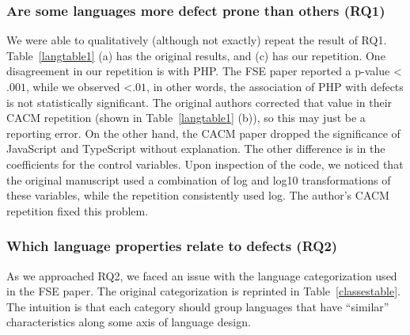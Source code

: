 \documentclass[acmsmall]{acmart}
\newcommand{\ts}{{\sf  TypeScript}\xspace}
\newcommand{\js}{{\sf  JavaScript}\xspace}
\newcommand{\php}{{\sf  PHP}\xspace}
\begin{document}
\subsubsection{Are some languages more defect prone than others (RQ1)}

We were able to qualitatively (although not exactly) repeat the result of
RQ1. Table~\ref{langtable1} (a) has the original results, and (c) has our
repetition. One disagreement in our repetition is with \php. The FSE paper
reported a p-value <$.001$, while we observed <$.01$, in other words, the
association of \php with defects is not statistically significant. The
original authors corrected that value in their CACM repetition (shown in
Table~\ref{langtable1} (b)), so this may just be a reporting error. On the
other hand, the CACM paper dropped the significance of \js and \ts without
explanation. The other difference is in the coefficients for the control
variables. Upon inspection of the code, we noticed that the original
manuscript used a combination of log and log10 transformations of these
variables, while the repetition consistently used log. The author's CACM
repetition fixed this problem.

\subsubsection{Which language properties relate to defects (RQ2)}

As we approached RQ2, we faced an issue with the language categorization
used in the FSE paper. The original categorization is reprinted in
Table~\ref{classestable}.  The intuition is that each category should group
languages that have ``similar'' characteristics along some axis of language
design.
\end{document}
